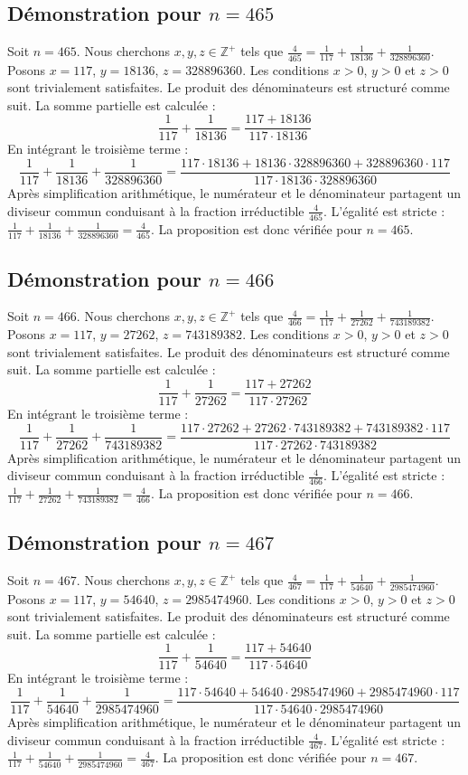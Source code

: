 \documentclass[11pt,a4paper]{article}
\begin{document}
\subsection{Démonstration pour $n = 465$}
Soit $n = 465$. Nous cherchons $x, y, z \in \mathbb{Z}^{+}$ tels que $\frac{4}{465} = \frac{1}{117} + \frac{1}{18136} + \frac{1}{328896360}$.
Posons $x = 117$, $y = 18136$, $z = 328896360$.
Les conditions $x > 0$, $y > 0$ et $z > 0$ sont trivialement satisfaites.
Le produit des dénominateurs est structuré comme suit. La somme partielle est calculée :
$$ \frac{1}{117} + \frac{1}{18136} = \frac{117+18136}{117 \cdot 18136} $$
En intégrant le troisième terme :
$$ \frac{1}{117} + \frac{1}{18136} + \frac{1}{328896360} = \frac{117 \cdot 18136 + 18136 \cdot 328896360 + 328896360 \cdot 117}{117 \cdot 18136 \cdot 328896360} $$
Après simplification arithmétique, le numérateur et le dénominateur partagent un diviseur commun conduisant à la fraction irréductible $\frac{4}{465}$.
L'égalité est stricte : $\frac{1}{117} + \frac{1}{18136} + \frac{1}{328896360} = \frac{4}{465}$.
La proposition est donc vérifiée pour $n = 465$.
\subsection{Démonstration pour $n = 466$}
Soit $n = 466$. Nous cherchons $x, y, z \in \mathbb{Z}^{+}$ tels que $\frac{4}{466} = \frac{1}{117} + \frac{1}{27262} + \frac{1}{743189382}$.
Posons $x = 117$, $y = 27262$, $z = 743189382$.
Les conditions $x > 0$, $y > 0$ et $z > 0$ sont trivialement satisfaites.
Le produit des dénominateurs est structuré comme suit. La somme partielle est calculée :
$$ \frac{1}{117} + \frac{1}{27262} = \frac{117+27262}{117 \cdot 27262} $$
En intégrant le troisième terme :
$$ \frac{1}{117} + \frac{1}{27262} + \frac{1}{743189382} = \frac{117 \cdot 27262 + 27262 \cdot 743189382 + 743189382 \cdot 117}{117 \cdot 27262 \cdot 743189382} $$
Après simplification arithmétique, le numérateur et le dénominateur partagent un diviseur commun conduisant à la fraction irréductible $\frac{4}{466}$.
L'égalité est stricte : $\frac{1}{117} + \frac{1}{27262} + \frac{1}{743189382} = \frac{4}{466}$.
La proposition est donc vérifiée pour $n = 466$.
\subsection{Démonstration pour $n = 467$}
Soit $n = 467$. Nous cherchons $x, y, z \in \mathbb{Z}^{+}$ tels que $\frac{4}{467} = \frac{1}{117} + \frac{1}{54640} + \frac{1}{2985474960}$.
Posons $x = 117$, $y = 54640$, $z = 2985474960$.
Les conditions $x > 0$, $y > 0$ et $z > 0$ sont trivialement satisfaites.
Le produit des dénominateurs est structuré comme suit. La somme partielle est calculée :
$$ \frac{1}{117} + \frac{1}{54640} = \frac{117+54640}{117 \cdot 54640} $$
En intégrant le troisième terme :
$$ \frac{1}{117} + \frac{1}{54640} + \frac{1}{2985474960} = \frac{117 \cdot 54640 + 54640 \cdot 2985474960 + 2985474960 \cdot 117}{117 \cdot 54640 \cdot 2985474960} $$
Après simplification arithmétique, le numérateur et le dénominateur partagent un diviseur commun conduisant à la fraction irréductible $\frac{4}{467}$.
L'égalité est stricte : $\frac{1}{117} + \frac{1}{54640} + \frac{1}{2985474960} = \frac{4}{467}$.
La proposition est donc vérifiée pour $n = 467$.
\end{document}
